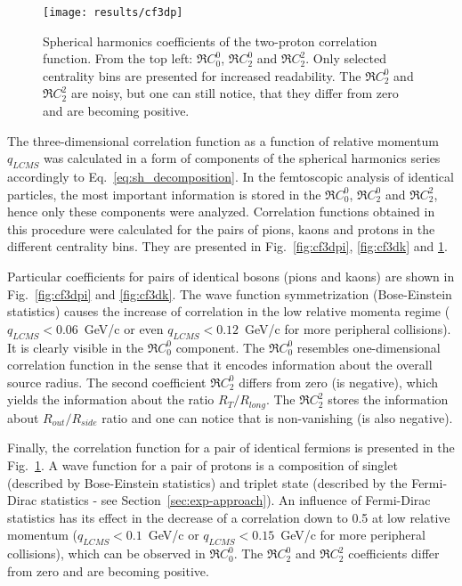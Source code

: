       \begin{figure}[b]
        \centering
        \centerline{\texttt{[image: results/cf3dp]}}
        \caption{Spherical harmonics coefficients of the two-proton correlation function. From the top left: $\Re C^0_0$, $\Re C^0_2$ and $\Re C^2_2$. Only selected centrality bins are presented for increased readability. The $\Re C^0_2$ and $\Re C^2_2$ are noisy, but one can still notice, that they differ from zero and are becoming positive.}
      \label{fig:cf3dp}
      \end{figure}

      The three-dimensional correlation function as a function of relative momentum $q_{LCMS}$ was calculated in a form of components of the spherical harmonics series accordingly to Eq.~\ref{eq:sh_decomposition}.
      In the femtoscopic analysis of identical particles, the most important information is stored in the $\Re C^0_0$, $\Re C^0_2$ and $\Re C^2_2$, hence only these components were analyzed.
      Correlation functions obtained in this procedure were calculated for the pairs of pions, kaons and protons in the different centrality bins.
      They are presented in Fig.~\ref{fig:cf3dpi}, \ref{fig:cf3dk} and \ref{fig:cf3dp}.
      
      Particular coefficients for pairs of identical bosons (pions and kaons) are shown in Fig.~\ref{fig:cf3dpi} and \ref{fig:cf3dk}.
      The wave function symmetrization (Bose-Einstein statistics) causes the increase of correlation in the low relative momenta regime (\mbox{$q_{LCMS}<0.06$~GeV/c} or even \mbox{$q_{LCMS}<0.12$~GeV/c} for more peripheral collisions).
      It is clearly visible in the $\Re C^0_0$ component.
      The $\Re C_0^0$ resembles one-dimensional correlation function in the sense that it encodes information about the overall source radius.
      The second coefficient $\Re C^0_2$ differs from zero (is negative), which yields the information about the ratio $R_T / R_{long}$.
      The $\Re C^2_2$ stores the information about $R_{out} / R_{side}$ ratio and one can notice that is non-vanishing (is also negative).

      Finally, the correlation function for a pair of identical fermions is presented in the Fig.~\ref{fig:cf3dp}.
      A wave function for a pair of protons is a composition of singlet (described by Bose-Einstein statistics) and triplet state (described by the Fermi-Dirac statistics - see Section~\ref{sec:exp-approach}).
      An influence of Fermi-Dirac statistics has its effect in the decrease of a correlation down to 0.5 at low relative momentum (\mbox{$q_{LCMS}<0.1$~GeV/c} or \mbox{$q_{LCMS}<0.15$~GeV/c} for more peripheral collisions), which can be observed in $\Re C^0_0$.
      The $\Re C^0_2$ and $\Re C^2_2$ coefficients differ from zero and are becoming positive.

